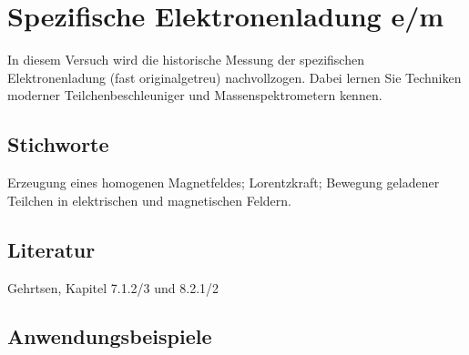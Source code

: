 \chapter{Spezifische Elektronenladung e/m}
\label{v:20}

In diesem Versuch wird die historische Messung der spezifischen Elektronenladung (fast originalgetreu) nachvollzogen. Dabei lernen Sie Techniken moderner Teilchenbeschleuniger und Massenspektrometern kennen.


\section{Stichworte}

Erzeugung eines homogenen Magnetfeldes; Lorentzkraft; Bewegung geladener Teilchen in elektrischen und magnetischen Feldern.
%
\section{Literatur}

Gehrtsen, Kapitel 7.1.2/3 und 8.2.1/2
%
\section{Anwendungsbeispiele}

